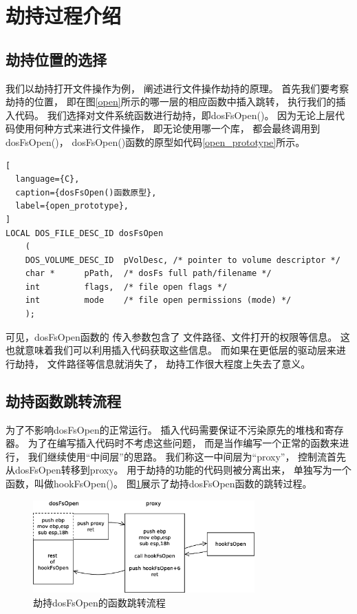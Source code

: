 \section{劫持过程介绍}

\subsection{劫持位置的选择}

我们以劫持打开文件操作为例，
阐述进行文件操作劫持的原理。
首先我们要考察劫持的位置，
即在图\ref{open}所示的哪一层的相应函数中插入跳转，
执行我们的插入代码。
我们选择对文件系统函数进行劫持，即dosFsOpen()。
因为无论上层代码使用何种方式来进行文件操作，
即无论使用哪一个库，
都会最终调用到dosFsOpen()，
dosFsOpen()函数的原型如代码\ref{open_prototype}所示。


\begin{lstlisting}[
  language={C},
  caption={dosFsOpen()函数原型},
  label={open_prototype},
]
LOCAL DOS_FILE_DESC_ID dosFsOpen
    (
    DOS_VOLUME_DESC_ID  pVolDesc, /* pointer to volume descriptor */
    char *      pPath,  /* dosFs full path/filename */
    int         flags,  /* file open flags */
    int         mode    /* file open permissions (mode) */
    );
\end{lstlisting}

可见，dosFsOpen函数的
传入参数包含了
文件路径、文件打开的权限等信息。
这也就意味着我们可以利用插入代码获取这些信息。
而如果在更低层的驱动层来进行劫持，
文件路径等信息就消失了，
劫持工作很大程度上失去了意义。

\subsection{劫持函数跳转流程}

为了不影响dosFsOpen的正常运行。
插入代码需要保证不污染原先的堆栈和寄存器。
为了在编写插入代码时不考虑这些问题，
而是当作编写一个正常的函数来进行，
我们继续使用“中间层”的思路。
我们称这一中间层为“proxy”，
控制流首先从dosFsOpen转移到proxy。
用于劫持的功能的代码则被分离出来，
单独写为一个函数，叫做hookFsOpen()。
图\ref{proxy}展示了劫持dosFsOpen函数的跳转过程。

\begin{figure}[h!]
    \centering
    \includegraphics[width=0.76\textwidth]{figure/proxy.eps}
    \caption{劫持dosFsOpen的函数跳转流程}
    \label{proxy}
\end{figure}

